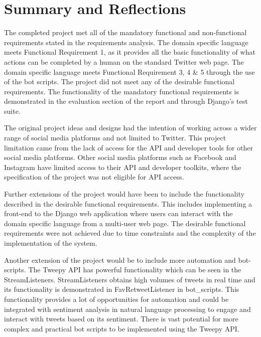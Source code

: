 \chapter{Summary and Reflections}

The completed project met all of the mandatory functional and non-functional requirements stated in the requirements analysis. The domain specific language meets Functional Requirement 1, as it provides all the basic functionality of what actions can be completed by a human on the standard Twitter web page. The domain specific language meets Functional Requirement 3, 4 \& 5 through the use of the bot scripts. The project did not meet any of the desirable functional requirements. The functionality of the mandatory functional requirements is demonstrated in the evaluation section of the report and through Django's test suite. \newline \par

The original project ideas and designs had the intention of working across a wider range of social media platforms and not limited to Twitter. This project limitation came from the lack of access for the API and developer tools for other social media platforms. Other social media platforms such as Facebook and Instagram have limited access to their API and developer toolkits, where the specification of the project was not eligible for API access. \newline \par

Further extensions of the project would have been to include the functionality described in the desirable functional requirements. This includes implementing a front-end to the Django web application where users can interact with the domain specific language from a multi-user web page. The desirable functional requirements were not achieved due to time constraints and the complexity of the implementation of the system. \newline \par

Another extension of the project would be to include more automation and bot-scripts. The Tweepy API has powerful functionality which can be seen in the StreamListeners. StreamListeners obtains high volumes of tweets in real time and its functionality is demonstrated in FavRetweetListener in bot\_scripts. This functionality provides a lot of opportunities for automation and could be integrated with sentiment analysis in natural language processing to engage and interact with tweets based on its sentiment. There is vast potential for more complex and practical bot scripts to be implemented using the Tweepy API. \newline \par
 
